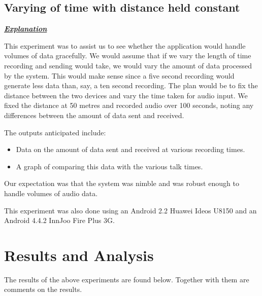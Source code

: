 \documentclass[12pt,svgnames,smaller]{article} %
\begin{document}


\subsection{Varying of time with distance held constant}

\textbf{\textit{\underline{Explanation}}}

This experiment was to assist us to see whether the application would handle volumes of data gracefully. We would assume that if we vary the length of time recording and sending would take, we would vary the amount of data processed by the system. This would make sense since a five second recording would generate less data than, say, a ten second recording.
The plan would be to fix the distance between the two devices and vary the time taken for audio input. We fixed the distance at 50 metres and recorded audio over 100 seconds, noting any differences between the amount of data sent and received.

The outputs anticipated include:

\begin{itemize}
	\item Data on the amount of data sent and received at various recording times.
	\item A graph of comparing this data with the various talk times.
\end{itemize}

Our expectation was that the system was nimble and was robust enough to handle volumes of audio data.

This experiment was also done using an Android 2.2 Huawei Ideos U8150 and an Android 4.4.2 InnJoo Fire Plus 3G.




\section{ Results and Analysis}

The results of the above experiments are found below. Together with them are comments on the results.
\end{document}
